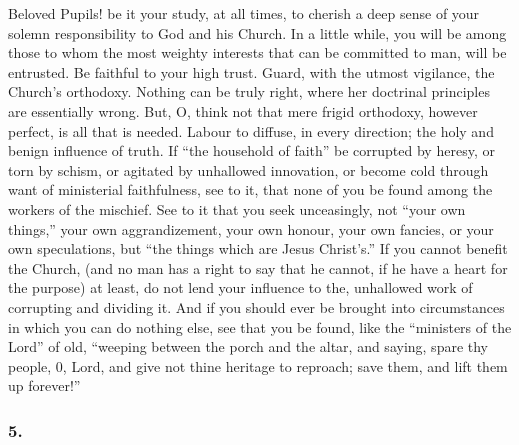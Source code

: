 \documentclass[
]{book}
\begin{document}
Beloved Pupils! be it your study, at all times, to cherish a deep sense of your solemn responsibility to God and his Church. In a little while, you will be among those to whom the most weighty interests that can be committed to man, will be entrusted. Be faithful to your high trust. Guard, with the utmost vigilance, the Church's orthodoxy. Nothing can be truly right, where her doctrinal principles are essentially wrong. But, O, think not that mere frigid orthodoxy, however perfect, is all that is needed. Labour to diffuse, in every direction; the holy and benign influence of truth. If ``the household of faith'' be corrupted by heresy, or torn by schism, or agitated by unhallowed innovation, or become cold through want of ministerial faithfulness, see to it, that none of you be found among the workers of the mischief. See to it that you seek unceasingly, not ``your own things,'' your own aggrandizement, your own honour, your own fancies, or your own speculations, but ``the things which are Jesus Christ's.'' If you cannot benefit the Church, (and no man has a right to say that he cannot, if he have a heart for the purpose) at least, do not lend your influence to the, unhallowed work of corrupting and dividing it. And if you should ever be brought into circumstances in which you can do nothing else, see that you be found, like the ``ministers of the Lord'' of old, ``weeping between the porch and the altar, and saying, spare thy people, 0, Lord, and give not thine heritage to reproach; save them, and lift them up forever!''

\hypertarget{section-16}{%
\subsubsection*{5.}\label{section-16}}
\end{document}
